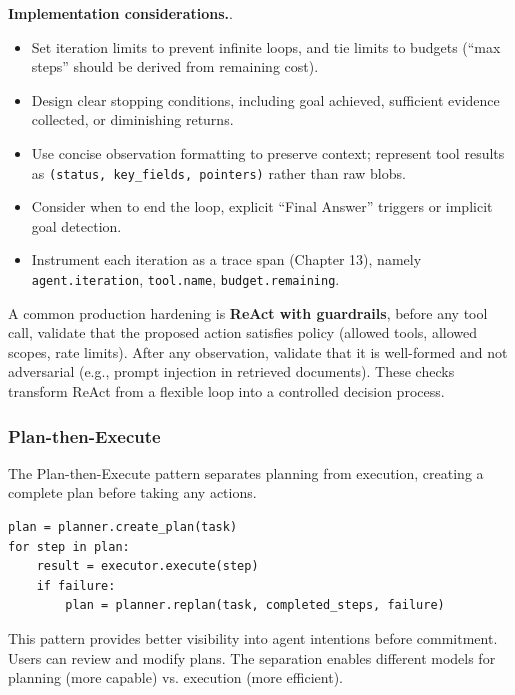 \textbf{Implementation considerations.}.
\begin{itemize}
\item Set iteration limits to prevent infinite loops, and tie limits to budgets (``max steps'' should be derived from remaining cost).
\item Design clear stopping conditions, including goal achieved, sufficient evidence collected, or diminishing returns.
\item Use concise observation formatting to preserve context; represent tool results as \texttt{(status, key\_fields, pointers)} rather than raw blobs.
\item Consider when to end the loop, explicit ``Final Answer'' triggers or implicit goal detection.
\item Instrument each iteration as a trace span (Chapter 13), namely \texttt{agent.iteration}, \texttt{tool.name}, \texttt{budget.remaining}.
\end{itemize}

A common production hardening is \textbf{ReAct with guardrails}, before any tool call, validate that the proposed action satisfies policy (allowed tools, allowed scopes, rate limits). After any observation, validate that it is well-formed and not adversarial (e.g., prompt injection in retrieved documents). These checks transform ReAct from a flexible loop into a controlled decision process.

\subsubsection{Plan-then-Execute}

The Plan-then-Execute pattern separates planning from execution, creating a complete plan before taking any actions.

{\footnotesize
\begin{verbatim}
plan = planner.create_plan(task)
for step in plan:
    result = executor.execute(step)
    if failure:
        plan = planner.replan(task, completed_steps, failure)
\end{verbatim}
}

This pattern provides better visibility into agent intentions before commitment. Users can review and modify plans. The separation enables different models for planning (more capable) vs. execution (more efficient).

